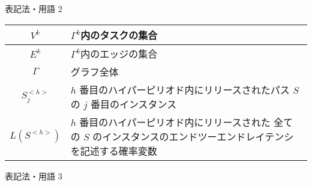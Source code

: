 \begin{frame}{表記法・用語 2}
{\begin{table}[tb]
{\begin{tabular}{|c|l|}
                    $V^{k}$                                                                                            & $\Gamma^{k}$内のタスクの集合                                                          \\\hline
                    $E^{k}$                                                                                            & $\Gamma^{k}$内のエッジの集合                                                          \\\hline
                    $\Gamma$                                                                                           & グラフ全体                                                                            \\\hline
                    $S_{j}^{<h>}$                                                                                      & $h$ 番目のハイパーピリオド内にリリースされたパス $S$ の $j$ 番目のインスタンス        \\\hline
                    $L\left(S^{<h>}\right)$                                                                            & \tabml{$h$ 番目のハイパーピリオド内にリリースされた                                   \\全ての $S$ のインスタンスのエンドツーエンドレイテンシを記述する確率変数} \\\hline
                \end{tabular}
            }
        \end{table}
    }
\end{frame}

\begin{frame}{表記法・用語 3}
\end{frame}
